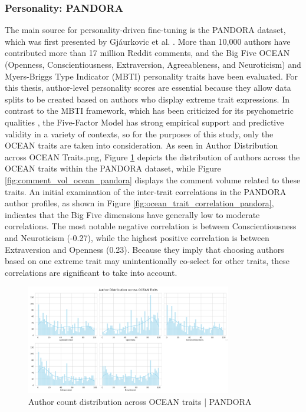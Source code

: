 \documentclass{DESSThesis}
\begin{document}
\subsubsection{Personality: PANDORA}
The main source for personality-driven fine-tuning is the PANDORA dataset, which was first presented by Gjáurkovic et al. \cite{gjurkovic_pandora_2021}. More than 10,000 authors have contributed more than 17 million Reddit comments, and the Big Five OCEAN (Openness, Conscientiousness, Extraversion, Agreeableness, and Neuroticism) and Myers-Briggs Type Indicator (MBTI) personality traits have been evaluated. For this thesis, author-level personality scores are essential because they allow data splits to be created based on authors who display extreme trait expressions. In contrast to the MBTI framework, which has been criticized for its psychometric qualities \cite{feng_five-factor_2024,okeefe_introducing_2012,mccrae_reinterpreting_1989}, the Five-Factor Model has strong empirical support and predictive validity in a variety of contexts, so for the purposes of this study, only the OCEAN traits are taken into consideration. As seen in Author Distribution across OCEAN Traits.png, Figure \ref{fig:author_traits_dist_pandora} depicts the distribution of authors across the OCEAN traits within the PANDORA dataset, while Figure \ref{fig:comment_vol_ocean_pandora} displays the comment volume related to these traits. An initial examination of the inter-trait correlations in the PANDORA author profiles, as shown in Figure \ref{fig:ocean_trait_correlation_pandora}, indicates that the Big Five dimensions have generally low to moderate correlations. The most notable negative correlation is between Conscientiousness and Neuroticism (-0.27), while the highest positive correlation is between Extraversion and Openness (0.23). Because they imply that choosing authors based on one extreme trait may unintentionally co-select for other traits, these correlations are significant to take into account.

\begin{figure}[H]
    \centering
    \includegraphics[width=0.8\textwidth]{img/data_eda/1_distribution_of_personality_scores.png}
    \caption{Author count distribution across OCEAN traits | PANDORA}
    \label{fig:author_traits_dist_pandora}
\end{figure}
\end{document}
